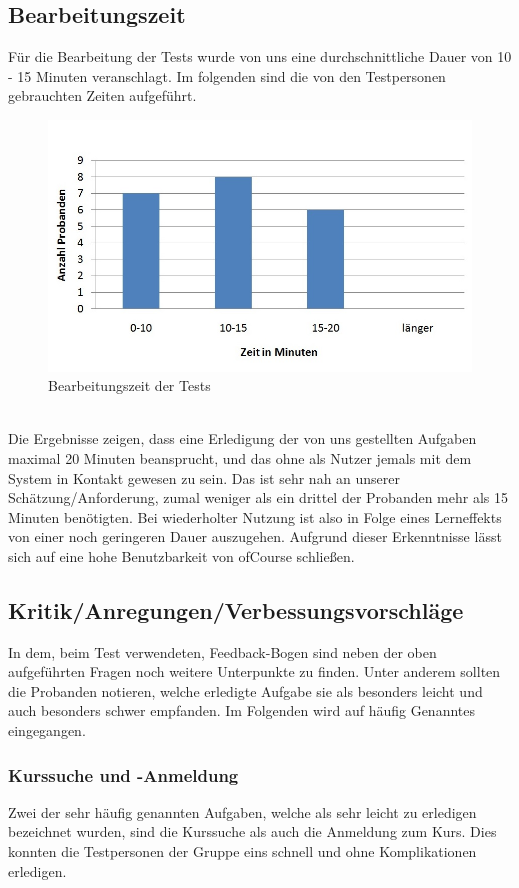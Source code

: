 \newpage
\subsection{Bearbeitungszeit}
Für die Bearbeitung der Tests wurde von uns eine durchschnittliche Dauer von 10 - 15 Minuten veranschlagt. Im folgenden sind die 
von den Testpersonen gebrauchten Zeiten aufgeführt.\\

\begin{figure}[h]
\centering
\includegraphics[width=0.7\linewidth]{img/Gesamtzeit}
\caption{Bearbeitungszeit der Tests}
\label{fig:Gesamtzeit}
\end{figure}
\ \\
Die Ergebnisse zeigen, dass eine Erledigung der von uns gestellten Aufgaben maximal 20 Minuten beansprucht, und das ohne als Nutzer jemals mit dem System in Kontakt gewesen zu sein. Das ist sehr nah an unserer Schätzung/Anforderung, zumal weniger als ein drittel der Probanden mehr als 15 Minuten benötigten. Bei wiederholter Nutzung ist also in Folge eines Lerneffekts von einer noch geringeren Dauer auszugehen. Aufgrund dieser Erkenntnisse lässt sich auf eine hohe Benutzbarkeit von ofCourse schließen.
\newpage



\subsection{Kritik/Anregungen/Verbessungsvorschläge}
In dem, beim Test verwendeten, Feedback-Bogen sind neben der oben aufgeführten Fragen noch weitere Unterpunkte zu finden. Unter anderem sollten die Probanden notieren, welche erledigte Aufgabe sie als besonders leicht und auch besonders schwer empfanden. Im Folgenden wird auf häufig Genanntes eingegangen.
\subsubsection{Kurssuche und -Anmeldung}
Zwei der sehr häufig genannten Aufgaben, welche als sehr leicht zu erledigen bezeichnet wurden, sind die Kurssuche als auch die Anmeldung zum Kurs. Dies konnten die Testpersonen der Gruppe eins schnell und ohne Komplikationen erledigen.
